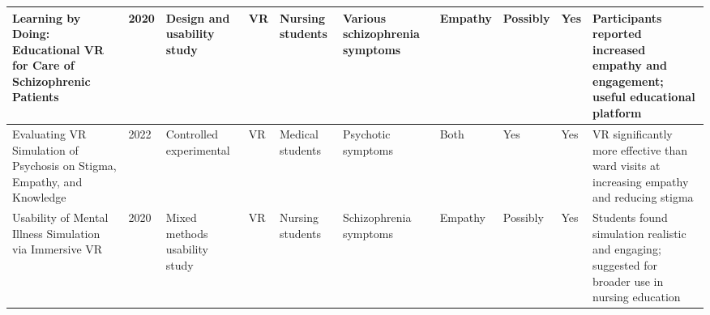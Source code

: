 \begin{landscape}
\begin{longtable}{|P{2.8cm}|P{0.6cm}|P{1.8cm}|P{1.2cm}|P{1.2cm}|P{2cm}|P{1.2cm}|P{1.2cm}|P{1.2cm}|P{3cm}|}
    \hline
    Learning by Doing: Educational VR for Care of Schizophrenic Patients & 2020 & Design and usability study & VR  & Nursing students & Various schizophrenia symptoms & Empathy & Possibly & Yes & Participants reported increased empathy and engagement; useful educational platform \\
    \hline
    Evaluating VR Simulation of Psychosis on Stigma, Empathy, and Knowledge & 2022 & Controlled experimental & VR & Medical students & Psychotic symptoms & Both & Yes & Yes & VR significantly more effective than ward visits at increasing empathy and reducing stigma \\
    \hline
    Usability of Mental Illness Simulation via Immersive VR & 2020 & Mixed methods usability study & VR & Nursing students & Schizophrenia symptoms & Empathy & Possibly & Yes & Students found simulation realistic and engaging; suggested for broader use in nursing education \\
    \hline


\end{longtable}
\end{landscape}

